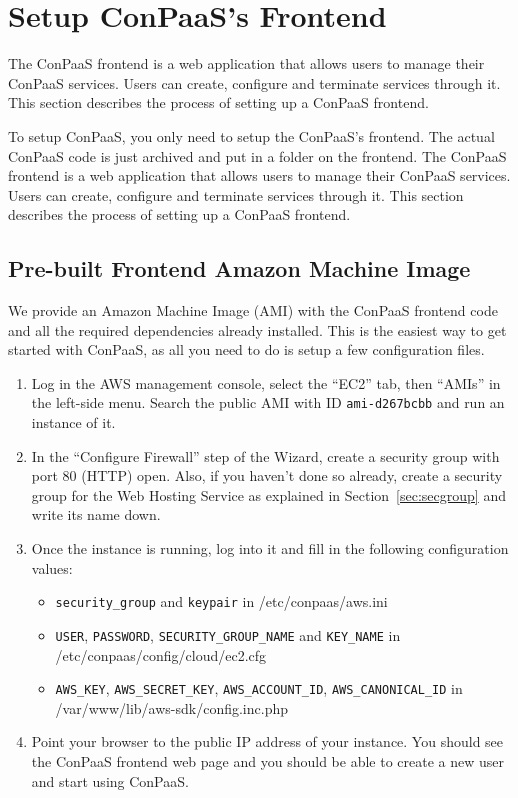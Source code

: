 \documentclass[10pt]{article}
\begin{document}
\section{Setup ConPaaS's Frontend}
\label{sec:frontend}

The ConPaaS frontend is a web application that allows users to manage
their ConPaaS services. Users can create, configure and terminate
services through it. This section describes the process of setting up
a ConPaaS frontend.

To setup ConPaaS, you only need to setup the ConPaaS's frontend. The
actual ConPaaS code is just archived and put in a folder on the frontend.
The ConPaaS frontend is a web application that allows users to manage
their ConPaaS services. Users can create, configure and terminate
services through it. This section describes the process of setting up
a ConPaaS frontend.

\subsection{Pre-built Frontend Amazon Machine Image}
\label{sec:frontend-ami}

We provide an Amazon Machine Image (AMI) with the ConPaaS frontend code and all
the required dependencies already installed. This is the easiest way to get
started with ConPaaS, as all you need to do is setup a few configuration
files.

\begin{enumerate}
\item Log in the AWS management console, select the ``EC2'' tab, then ``AMIs''
  in the left-side menu. Search the public AMI with ID \verb+ami-d267bcbb+ and
  run an instance of it.
\item In the ``Configure Firewall'' step of the Wizard, create a security group
  with port 80 (HTTP) open. Also, if you haven't done so already, create a
  security group for the Web Hosting Service as explained in
  Section~\ref{sec:secgroup} and write its name down.
\item Once the instance is running, log into it and fill in the following
  configuration values:
  \begin{itemize}
  \item \verb+security_group+ and \verb|keypair| in /etc/conpaas/aws.ini
  \item \verb+USER+, \verb+PASSWORD+, \verb+SECURITY_GROUP_NAME+ and \verb+KEY_NAME+ in /etc/conpaas/config/cloud/ec2.cfg
  \item \verb+AWS_KEY+, \verb+AWS_SECRET_KEY+, \verb+AWS_ACCOUNT_ID+, \verb+AWS_CANONICAL_ID+ in /var/www/lib/aws-sdk/config.inc.php
  \end{itemize}
\item Point your browser to the public IP address of your instance. You should
  see the ConPaaS frontend web page and you should be able to create a new user
  and start using ConPaaS.
\end{enumerate}
\end{document}
